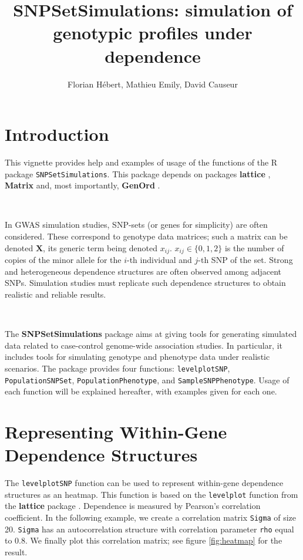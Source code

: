 \documentclass[12pt]{article}
\title{SNPSetSimulations: simulation of genotypic profiles under dependence}
\date{}
\author{Florian H\'{e}bert, Mathieu Emily, David Causeur}
\begin{document}


\maketitle

	\section{Introduction}

\noindent This vignette provides help and examples of usage of the functions of the R package \texttt{SNPSetSimulations}. This package depends on packages {\bfseries lattice} \cite{lattice}, {\bfseries Matrix} \cite{Matrix} and, most importantly, {\bfseries GenOrd} \cite{GenOrd}.

	~

	\noindent In GWAS simulation studies, SNP-sets (or genes for simplicity) are often considered. These correspond to genotype data matrices; such a matrix can be denoted $\bm{X}$, its generic term being denoted $x_{ij}$. $x_{ij} \in \{0,1,2\}$ is the number of copies of the minor allele for the $i$-th individual and $j$-th SNP of the set. Strong and heterogeneous dependence structures are often observed among adjacent SNPs. Simulation studies must replicate such dependence structures to obtain realistic and reliable results.

	~

	\noindent The {\bfseries SNPSetSimulations} package aims at giving tools for generating simulated data related to case-control genome-wide association studies. In particular, it includes tools for simulating genotype and phenotype data under realistic scenarios. The package provides four functions: \texttt{levelplotSNP}, \texttt{PopulationSNPSet}, \texttt{PopulationPhenotype}, and \texttt{SampleSNPPhenotype}. Usage of each function will be explained hereafter, with examples given for each one.

	\section{Representing Within-Gene Dependence Structures}

	 The \texttt{levelplotSNP} function can be used to represent within-gene dependence structures as an heatmap. This function is based on the \texttt{levelplot} function from the {\bfseries lattice} package \cite{lattice}. Dependence is measured by Pearson's correlation coefficient. In the following example, we create a correlation matrix \texttt{Sigma} of size 20. \texttt{Sigma} has an autocorrelation structure with correlation parameter \texttt{rho} equal to 0.8. We finally plot this correlation matrix; see figure \ref{fig:heatmap} for the result.
\end{document}
